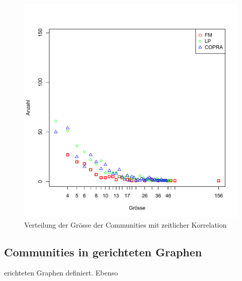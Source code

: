 \begin{figure}[h]
  \centering
  \includegraphics[scale=0.8]{images/time_corr_dist.pdf}
  \caption{Verteilung der Gr\"osse der Communities mit zeitlicher Korrelation}
  \label{fig:time-corr-dist}
\end{figure}


\subsection{Communities in gerichteten Graphen}
\label{sec:comm-gericht-graph}
erichteten Graphen definiert. Ebenso 

